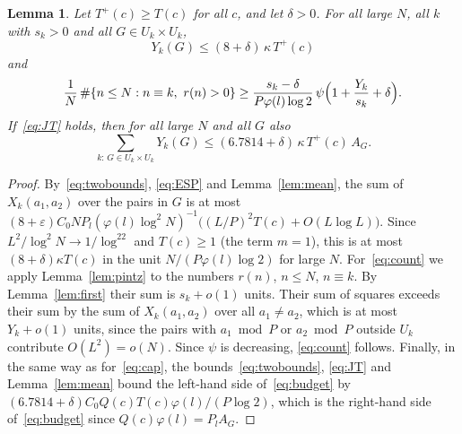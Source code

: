 \documentclass[11pt]{amsart}
\newtheorem{lemma}[theorem]{Lemma}
\theoremstyle{definition}
\theoremstyle{remark}
\numberwithin{equation}{section}
\newcommand{\Lich}{6.7814}
\begin{document}
\begin{lemma}\label{lem:constraints}
Let $T^+(c)\ge T(c)$ for all $c$, and let $\delta>0$. For all large $N$, all $k$ with $s_k>0$ and all $G\in U_k\times U_k$,
\begin{equation}\label{eq:cap}
Y_k(G)\le(8+\delta)\,\kappa\,T^+(c)
\end{equation}
and
\begin{equation}\label{eq:count}
\frac1N\,\#\{n\le N:n\equiv k,\ r(n)>0\}\ge\frac{s_k-\delta}{P\varphi(l)\log2}\,\psi\Bigl(1+\frac{Y_k}{s_k}+\delta\Bigr).
\end{equation}
If~\eqref{eq:JT} holds, then for all large $N$ and all $G$ also
\begin{equation}\label{eq:budget}
\sum_{k:\,G\in U_k\times U_k}Y_k(G)\le(\Lich+\delta)\,\kappa\,T^+(c)\,A_G.
\end{equation}
\end{lemma}

\begin{proof}
By~\eqref{eq:twobounds}, \eqref{eq:ESP} and Lemma~\ref{lem:mean}, the sum of $X_k(a_1,a_2)$ over the pairs in $G$ is at most $(8+\varepsilon)C_0NP_l(\varphi(l)\log^2N)^{-1}\bigl((L/P)^2T(c)+O(L\log L)\bigr)$. Since $L^2/\log^2N\to1/\log^22$ and $T(c)\ge1$ (the term $m=1$), this is at most $(8+\delta)\kappa T(c)$ in the unit $N/(P\varphi(l)\log2)$ for large $N$. For~\eqref{eq:count} we apply Lemma~\ref{lem:pintz} to the numbers $r(n)$, $n\le N$, $n\equiv k$. By Lemma~\ref{lem:first} their sum is $s_k+o(1)$ units. Their sum of squares exceeds their sum by the sum of $X_k(a_1,a_2)$ over all $a_1\ne a_2$, which is at most $Y_k+o(1)$ units, since the pairs with $a_1\bmod P$ or $a_2\bmod P$ outside $U_k$ contribute $O(L^2)=o(N)$. Since $\psi$ is decreasing, \eqref{eq:count} follows. Finally, in the same way as for~\eqref{eq:cap}, the bounds~\eqref{eq:twobounds}, \eqref{eq:JT} and Lemma~\ref{lem:mean} bound the left-hand side of~\eqref{eq:budget} by $(\Lich+\delta)C_0Q(c)T(c)\varphi(l)/(P\log2)$, which is the right-hand side of~\eqref{eq:budget} since $Q(c)\varphi(l)=P_lA_G$.
\end{proof}
\end{document}
